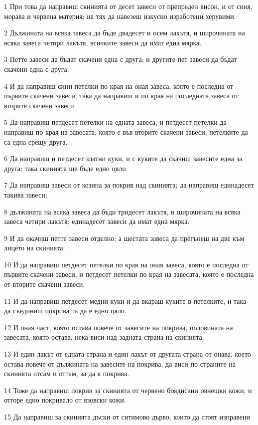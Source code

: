 \par 1 При това да направиш скинията от десет завеси от препреден висон, и от синя, морава и червена материя; на тях да навезеш изкусно изработени херувими.
\par 2 Дължината на всяка завеса да бъде двадесет и осем лакътя, и широчината на всяка завеса четири лакътя, всичките завеси да имат една мярка.
\par 3 Петте завеси да бъдат скачени една с друга; и другите пет завеси да бъдат скачени една с друга.
\par 4 И да направиш сини петелки по края на оная завеса, която е последна от първите скачени завеси; така да направиш и по края на последната завеса от вторите скачени завеси.
\par 5 Да направиш петдесет петелки на едната завеса, и петдесет петелки да направиш по края на завесата; която е във вторите скачени завеси; петелките да са една срещу друга.
\par 6 Да направиш и петдесет златни куки, и с куките да скачиш завесите една за друга; така скинията ще бъде едно цяло.
\par 7 Да направиш завеси от козина за покрив над скинията; да направиш единадесет такива завеси;
\par 8 дължината на всяка завеса да бъди тридесет лакътя, и широчината на всяка завеса четири лакътя; единадесет завеси да имат една мярка.
\par 9 И да окачиш петте завеси отделно; а шестата завеса да прегънеш на две към лицето на скинията.
\par 10 И да направиш петдесет петелки по края на оная завеса, която е последна от първите скачени завеси, и петдесет петелки по края на завесата, която е последна от вторите скачени завеси.
\par 11 И да направиш петдесет медни куки и да вкараш куките в петелките, и така да съединиш покрива та да е едно цяло.
\par 12 И оная част, която остава повече от завесите на покрива, половината на завесата, която остава, нека виси над задната страна на скинията.
\par 13 И един лакът от едната страна и един лакът от другата страна от онава, което остава повече от дължината на завесите на покрива, да виси по страните на скинията отсам и оттам, за да я покрива.
\par 14 Тоже да направиш покрив за скинията от червено боядисани овнешки кожи, и отгоре едно покривало от язовски кожи.
\par 15 Да направиш за скинията дъски от ситимово дърво, които да стоят изправени
